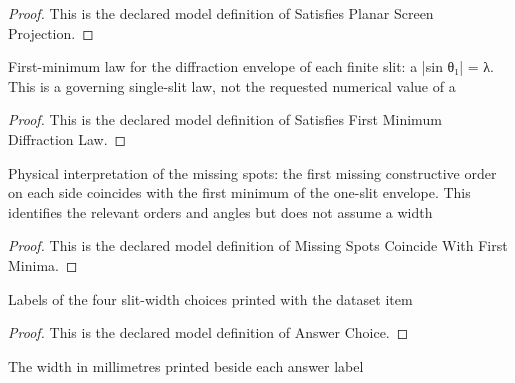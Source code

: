 \begin{proof}
  This is the declared model definition of Satisfies Planar Screen Projection.
\end{proof}
\begin{definition}
  \label{def:physics:phyx-mini-0122:phyxminiproblems-problemphyxmini0122-satisfiesfirstminimumdiffractionlaw}
  First-minimum law for the diffraction envelope of each finite slit: a |sin θ₁| = λ. This is a governing single-slit law, not the requested numerical value of a
\end{definition}
\begin{proof}
  This is the declared model definition of Satisfies First Minimum Diffraction Law.
\end{proof}
\begin{definition}
  \label{def:physics:phyx-mini-0122:phyxminiproblems-problemphyxmini0122-missingspotscoincidewithfirstminima}
  Physical interpretation of the missing spots: the first missing constructive order on each side coincides with the first minimum of the one-slit envelope. This identifies the relevant orders and angles but does not assume a width
\end{definition}
\begin{proof}
  This is the declared model definition of Missing Spots Coincide With First Minima.
\end{proof}
\begin{definition}
  \label{def:physics:phyx-mini-0122:phyxminiproblems-problemphyxmini0122-answerchoice}
  Labels of the four slit-width choices printed with the dataset item
\end{definition}
\begin{proof}
  This is the declared model definition of Answer Choice.
\end{proof}
\begin{definition}
  \label{def:physics:phyx-mini-0122:phyxminiproblems-problemphyxmini0122-displayedwidthinmillimeters}
  The width in millimetres printed beside each answer label
\end{definition}
